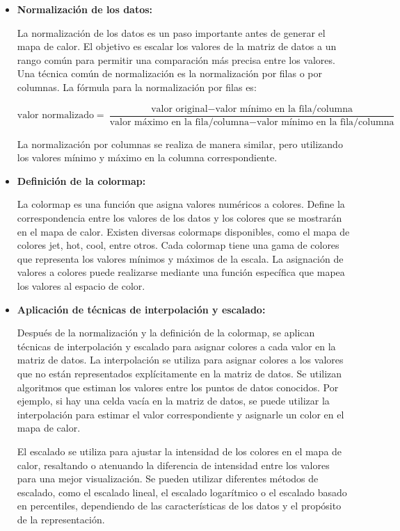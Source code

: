 \documentclass{article}
\begin{document}
\begin{itemize}
\begin{itemize}
\item   \textbf{Normalización de los datos:}

La normalización de los datos es un paso importante antes de generar el mapa de calor. El objetivo es escalar los valores de la matriz de datos a un rango común para permitir una comparación más precisa entre los valores. Una técnica común de normalización es la normalización por filas o por columnas. La fórmula para la normalización por filas es:

\begin{equation}
    \textrm{valor normalizado} = \frac{\textrm{valor original} - \textrm{valor mínimo en la fila/columna}}{\textrm{valor máximo en la fila/columna} - \textrm{valor mínimo en la fila/columna}}
\end{equation}

La normalización por columnas se realiza de manera similar, pero utilizando los valores mínimo y máximo en la columna correspondiente.

\item   \textbf{Definición de la colormap:}

La colormap es una función que asigna valores numéricos a colores. Define la correspondencia entre los valores de los datos y los colores que se mostrarán en el mapa de calor. Existen diversas colormaps disponibles, como el mapa de colores \textrm{jet}, \textrm{hot}, \textrm{cool}, entre otros. Cada colormap tiene una gama de colores que representa los valores mínimos y máximos de la escala. La asignación de valores a colores puede realizarse mediante una función específica que mapea los valores al espacio de color.

\item   \textbf{Aplicación de técnicas de interpolación y escalado:}

Después de la normalización y la definición de la colormap, se aplican técnicas de interpolación y escalado para asignar colores a cada valor en la matriz de datos. La interpolación se utiliza para asignar colores a los valores que no están representados explícitamente en la matriz de datos. Se utilizan algoritmos que estiman los valores entre los puntos de datos conocidos. Por ejemplo, si hay una celda vacía en la matriz de datos, se puede utilizar la interpolación para estimar el valor correspondiente y asignarle un color en el mapa de calor.

El escalado se utiliza para ajustar la intensidad de los colores en el mapa de calor, resaltando o atenuando la diferencia de intensidad entre los valores para una mejor visualización. Se pueden utilizar diferentes métodos de escalado, como el escalado lineal, el escalado logarítmico o el escalado basado en percentiles, dependiendo de las características de los datos y el propósito de la representación.


\end{itemize}
\end{itemize}
\end{document}
